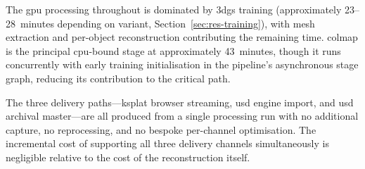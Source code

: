 The \acrshort{gpu} processing throughout is dominated by \acrshort{3dgs} training
(approximately 23--28~minutes depending on variant, Section~\ref{sec:res-training}),
with mesh extraction and per-object reconstruction contributing the remaining time.
\acrshort{colmap} is the principal \acrshort{cpu}-bound stage at approximately
43~minutes, though it runs concurrently with early training initialisation in the
pipeline's asynchronous stage graph, reducing its contribution to the critical path.

\begin{keyfinding}
The three delivery paths---\acrshort{ksplat} browser streaming, \acrshort{usd}
engine import, and \acrshort{usd} archival master---are all produced from a single
processing run with no additional capture, no reprocessing, and no bespoke
per-channel optimisation. The incremental cost of supporting all three delivery
channels simultaneously is negligible relative to the cost of the reconstruction
itself.
\end{keyfinding}
